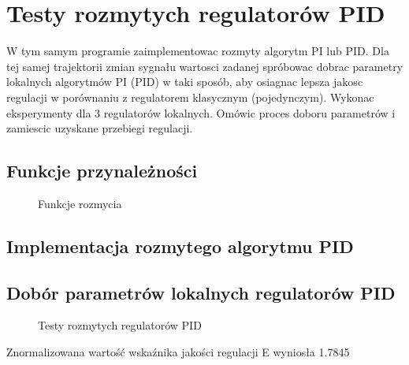\section{Testy rozmytych regulatorów PID}
\label{lab:zad4}

W tym samym programie zaimplementowac rozmyty algorytm PI lub PID. Dla tej samej
trajektorii zmian sygnału wartosci zadanej spróbowac dobrac parametry lokalnych
algorytmów PI (PID) w taki sposób, aby osiagnac lepsza jakosc regulacji w porównaniu
z regulatorem klasycznym (pojedynczym). Wykonac eksperymenty dla 3 regulatorów
lokalnych. Omówic proces doboru parametrów i zamiescic uzyskane przebiegi regulacji.

\subsection{Funkcje przynależności}
\label{lab:zad4:fuzzyFunction}

\begin{figure}[H] 
    \centering
    
    \caption{Funkcje rozmycia}
    \label{lab:zad4:fuzzyFunction:figure}
 \end{figure}

\newpage

\subsection{Implementacja rozmytego algorytmu PID}
\label{lab:zad4:implPID}


\newpage

\subsection{Dobór parametrów lokalnych regulatorów PID}
\label{lab:zad4:paramPID}

\begin{figure}[H] 
    \centering
    
    \caption{Testy rozmytych regulatorów PID}
    \label{lab:zad4:eksperymenty:figure}
 \end{figure}

 Znormalizowana wartość wskaźnika jakości regulacji E wyniosła \num{1.7845}

\newpage
